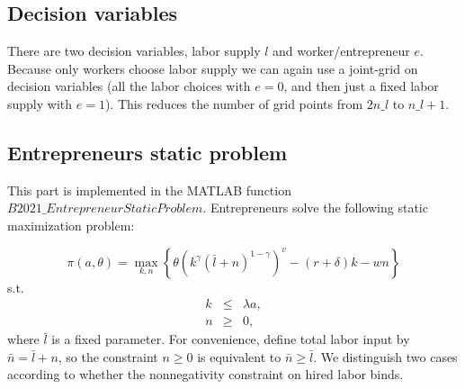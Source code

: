 \documentclass[11pt,fleqn]{article}
\begin{document}
\subsection{Decision variables}
There are two decision variables, labor supply $l$ and worker/entrepreneur $e$. Because only workers choose labor supply we can again use a joint-grid on decision variables (all the labor choices with $e=0$, and then just a fixed labor supply with $e=1$). This reduces the number of grid points from $2n\_{}l$ to $n\_{}l+1$.

\subsection{Entrepreneurs static problem \label{sec:entre_static}}

This part is implemented in the MATLAB function $B2021\_EntrepreneurStaticProblem$. Entrepreneurs solve the following static maximization problem:


\begin{equation*}
	\pi \left( a,\theta \right) =\max_{k,n}\left\{ \theta \left( k^{\gamma
	}\left( \bar{l}+n\right) ^{1-\gamma }\right) ^{v}-\left( r+\delta \right)
	k-wn\right\} 
\end{equation*}%
s.t.%
\begin{eqnarray*}
	k &\leq &\lambda a, \\
	n &\geq &0,
\end{eqnarray*}%
where $\bar{l}$ is a fixed parameter. For convenience, define total labor input by $\bar{n}=\bar{l}+n$, so the constraint $n\geq 0$ is equivalent to $\bar{n}\geq \bar{l}$. We distinguish two cases according to whether the nonnegativity constraint on hired labor binds.
\end{document}
